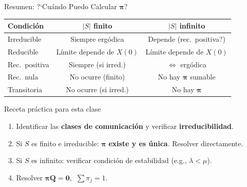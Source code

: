 \documentclass[aspectratio=1610, 10pt]{beamer}
\newcommand{\bpi}{\boldsymbol{\pi}}
\newcommand{\bQ}{\mathbf{Q}}
\begin{document}
\begin{frame}{Resumen: ?`Cu\'{a}ndo Puedo Calcular $\bpi$?}
  \begin{center}
    \renewcommand{\arraystretch}{1.5}
    \begin{tabular}{lcc}
      \toprule
      \textbf{Condici\'{o}n} & \textbf{$|S|$ finito} & \textbf{$|S|$ infinito} \\
      \midrule
      Irreducible & Siempre erg\'{o}dica & Depende (rec.\ positiva?) \\
      Reducible & L\'{i}mite depende de $X(0)$ & L\'{i}mite depende de $X(0)$ \\
      Rec.\ positiva & Siempre (si irred.) & $\Leftrightarrow$ erg\'{o}dica \\
      Rec.\ nula & No ocurre (finito) & No hay $\bpi$ sumable \\
      Transitoria & No ocurre (si irred.) & No hay $\bpi$ \\
      \bottomrule
    \end{tabular}
  \end{center}

  \begin{block}{Receta pr\'{a}ctica para esta clase}
    \begin{enumerate}
      \item Identificar las \textbf{clases de comunicaci\'{o}n} y verificar \textbf{irreducibilidad}.
      \item Si $S$ es finito e irreducible: $\bpi$ \textbf{existe y es \'{u}nica}. Resolver directamente.
      \item Si $S$ es infinito: verificar condici\'{o}n de estabilidad (e.g., $\lambda < \mu$).
      \item Resolver $\bpi\bQ = \mathbf{0}$, $\;\sum \pi_j = 1$.
    \end{enumerate}
  \end{block}
\end{frame}
\end{document}

